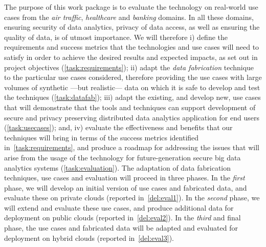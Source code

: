 \begin{Workpackage}{\thewpno}
\begin{WPDescription}
The purpose of this work package is to evaluate the \TheProject technology on real-world use cases from the \emph{air traffic}, \emph{healthcare} and \emph{banking} domains. In all these domains, ensuring security of data analytics, privacy of data access, as well as ensuring the quality of data, is of utmost importance. We will therefore i) define the requirements and success metrics that the \TheProject{} technologies and use cases will need to satisfy in order to achieve the desired results and expected impacts, as set out in project objectives (\ref{task:requirements}); ii) adapt the \TheProject{} \emph{data fabrication} technique to the particular use cases considered, therefore providing the use cases with large volumes of synthetic ---but realistic--- data on which it is safe to develop and test the \TheProject{} techniques (\ref{task:datafab}); iii) adapt the existing, and develop new, use cases that will demonstrate that the \TheProject{} tools and techniques can support development of secure and privacy preserving distributed data analytics application for end users (\ref{task:usecases}); and, iv)  evaluate the effectiveness and benefits that our techniques will bring in terms of the success metrics identified in~\ref{task:requirements}, and produce a roadmap for addressing the issues that will arise from the usage of the \TheProject{} technology for future-generation secure big data analytics systems (\ref{task:evaluation}). The adaptation of data fabrication techniques, use cases and evaluation will proceed in three phases. In the \emph{first} phase, we will develop an initial version of use cases and fabricated data, and evaluate these on private clouds (reported in~\ref{del:eval1}). In the \emph{second} phase, we will extend and evaluate these use cases, and produce additional data for deployment on public clouds (reported in~\ref{del:eval2}). In the \emph{third} and final phase, the use cases and fabricated data will be adapted and evaluated for deployment on hybrid clouds (reported in~\ref{del:eval3}).
\end{WPDescription}

\begin{Task}


\end{Task}
\end{Workpackage}
